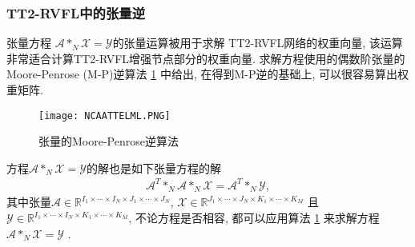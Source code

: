 \subsubsection{TT2-RVFL中的张量逆} \label{Trapezoidsection5-1}
张量方程 $\mathcal A *_N \mathcal X = \mathcal Y$的张量运算被用于求解 TT2-RVFL网络的权重向量,  该运算非常适合计算TT2-RVFL增强节点部分的权重向量.
求解方程使用的偶数阶张量的 Moore-Penrose (M-P)逆算法 \ref{NCAATTELML} 中给出, 在得到M-P逆的基础上, 可以很容易算出权重矩阵.
\begin{figure} [!htp]
    \begin{center}
        \texttt{[image: NCAATTELML.PNG]}
    \end{center}
    \caption{张量的Moore-Penrose逆算法\cite{HuangZhao2018NCAA-5838}}
    \label{NCAATTELML}
\end{figure}
\begin{remark}
    方程$\mathcal A *_N \mathcal X = \mathcal Y$的解也是如下张量方程的解
\begin{align}
    \mathcal A^T *_N\mathcal  A *_N \mathcal X = \mathcal A^T *_N \mathcal Y,
\end{align}
其中张量$\mathcal A \in \mathbb R^{I_1\times \cdots\times I_N\times J_1\times \cdots\times J_N} $, $\mathcal X \in \mathbb R^{J_1\times \cdots\times J_N\times K_1\times \cdots\times K_M} $
且 $\mathcal Y \in \mathbb R^{I_1\times \cdots\times I_N\times K_1\times \cdots\times K_M}$,
不论方程是否相容, 都可以应用算法 \ref{NCAATTELML} 来求解方程 $\mathcal  A *_N \mathcal X = \mathcal Y$ \cite{HuangZhao2018NCAA-5838}.
\end{remark}
